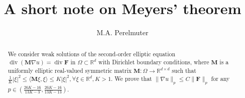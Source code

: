 \documentclass[12pt,reqno]{amsart}
\begin{document}
\title{A short note on Meyers' theorem}
\author{M.A. Perelmuter}
\address{SCAD Soft Ltd., 3a Osvity Street, Kyiv, 03037, Ukraine}

\begin{abstract}
We consider weak solutions of the second-order elliptic equation $\operatorname{div} (\mathbf{M}\nabla u) = \operatorname{div}\mathbf{F}$ in $\Omega\subset {\mathbb R}^d$ with Dirichlet boundary conditions, where $\mathbf{M}$ is a uniformly elliptic real-valued symmetric matrix $\mathbf{M}:\Omega \rightarrow \mathbb{R}^{d\times d}$ such that $\frac{1}{K} |\xi|^2 \leq\langle \mathbf{M}\xi,\xi \rangle \leq K |\xi|^2, \forall \xi \in \mathbb{R}^d, K > 1$. We prove that $\|\nabla u\|_p \leq C\|\mathbf{F}\|_p$ for any $p\in \left(\frac{26K-16}{13K-3}, \frac{26K-16}{13K-13}\right)$.
\end{abstract}
\maketitle
\end{document}
